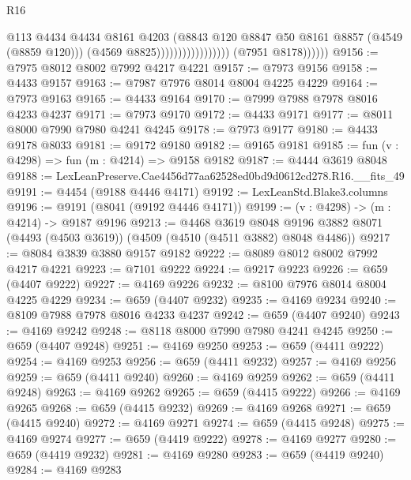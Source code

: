 \begin{lexlean}{R16}
\begin{coremodule}
                                              @113
                                              @4434
                                              @4434
                                              @8161
                                              @4203
                                              (@8843
                                                @120
                                                @8847
                                                @50
                                                @8161
                                                @8857
                                                (@4549 (@8859 @120)))
                                              (@4569 @8825)))))))))))))))))
              (@7951 @8178))))))
@9156 := @7975 @8012 @8002 @7992 @4217 @4221
@9157 := @7973 @9156
@9158 := @4433 @9157
@9163 := @7987 @7976 @8014 @8004 @4225 @4229
@9164 := @7973 @9163
@9165 := @4433 @9164
@9170 := @7999 @7988 @7978 @8016 @4233 @4237
@9171 := @7973 @9170
@9172 := @4433 @9171
@9177 := @8011 @8000 @7990 @7980 @4241 @4245
@9178 := @7973 @9177
@9180 := @4433 @9178 @8033
@9181 := @9172 @9180
@9182 := @9165 @9181
@9185 := fun (v : @4298) => fun (m : @4214) => @9158 @9182
@9187 := @4444 @3619 @8048
@9188 := LexLeanPreserve.Cae4456d77aa62528ed0bd9d0612cd278.R16.__fits_49
@9191 := @4454 (@9188 @4446 @4171)
@9192 := LexLeanStd.Blake3.columns
@9196 := @9191 (@8041 (@9192 @4446 @4171))
@9199 := (v : @4298) -> (m : @4214) -> @9187 @9196
@9213 := @4468
    @3619
    @8048
    @9196
    @3882
    @8071
    (@4493 (@4503 @3619))
    (@4509 (@4510 (@4511 @3882) @8048 @4486))
@9217 := @8084 @3839 @3880 @9157 @9182
@9222 := @8089 @8012 @8002 @7992 @4217 @4221
@9223 := @7101 @9222
@9224 := @9217 @9223
@9226 := @659 (@4407 @9222)
@9227 := @4169 @9226
@9232 := @8100 @7976 @8014 @8004 @4225 @4229
@9234 := @659 (@4407 @9232)
@9235 := @4169 @9234
@9240 := @8109 @7988 @7978 @8016 @4233 @4237
@9242 := @659 (@4407 @9240)
@9243 := @4169 @9242
@9248 := @8118 @8000 @7990 @7980 @4241 @4245
@9250 := @659 (@4407 @9248)
@9251 := @4169 @9250
@9253 := @659 (@4411 @9222)
@9254 := @4169 @9253
@9256 := @659 (@4411 @9232)
@9257 := @4169 @9256
@9259 := @659 (@4411 @9240)
@9260 := @4169 @9259
@9262 := @659 (@4411 @9248)
@9263 := @4169 @9262
@9265 := @659 (@4415 @9222)
@9266 := @4169 @9265
@9268 := @659 (@4415 @9232)
@9269 := @4169 @9268
@9271 := @659 (@4415 @9240)
@9272 := @4169 @9271
@9274 := @659 (@4415 @9248)
@9275 := @4169 @9274
@9277 := @659 (@4419 @9222)
@9278 := @4169 @9277
@9280 := @659 (@4419 @9232)
@9281 := @4169 @9280
@9283 := @659 (@4419 @9240)
@9284 := @4169 @9283

\end{coremodule}
\end{lexlean}
